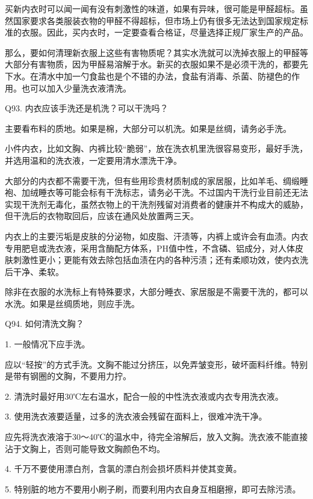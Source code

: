 \documentclass[12pt,UTF8]{ctexbook}
\begin{document}
买新内衣时可以闻一闻有没有刺激性的味道，如果有异味，很可能是甲醛超标。虽然国家要求各类服装衣物的甲醛不得超标，但市场上仍有很多无法达到国家规定标准的衣服。因此，买内衣时，一定要查看合格证，尽量选择正规厂家生产的产品。


那么，要如何清理新衣服上这些有害物质呢？其实水洗就可以洗掉衣服上的甲醛等大部分有害物质，因为甲醛易溶解于水。新买的衣服如果不是必须干洗的，都要先下水。在清水中加一勺食盐也是个不错的办法，食盐有消毒、杀菌、防褪色的作用。也可以加入少量洗衣液清洗。





Q93. 内衣应该手洗还是机洗？可以干洗吗？


主要看布料的质地。如果是棉，大部分可以机洗。如果是丝绸，请务必手洗。

小件内衣，比如文胸、内裤比较“脆弱”，放在洗衣机里洗很容易变形，最好手洗，并选用温和的洗衣液，一定要用清水漂洗干净。

大部分的内衣都不需要干洗，但有些用珍贵材质制成的家居服，比如羊毛、绸缎睡袍、加绒睡衣等可能会标有干洗标志，请务必干洗。不过国内干洗行业目前还无法实现干洗剂无毒化，虽然衣物上的干洗剂残留对消费者的健康并不构成大的威胁，但干洗后的衣物取回后，应该在通风处放置两三天。


内衣上的主要污垢是皮肤的分泌物，如皮脂、汗渍等，内裤上或许会有血渍。内衣专用肥皂或洗衣液，采用含酶配方体系，PH值中性，不含磷、铝成分，对人体皮肤刺激性更小；更能有效去除包括血渍在内的各种污渍；还有柔顺功效，使内衣洗后干净、柔软。


除非在衣服的水洗标上有特殊要求，大部分睡衣、家居服是不需要干洗的，都可以水洗。如果是丝绸质地，则应手洗。





Q94. 如何清洗文胸？


1. 一般情况下应手洗。

应以“轻按”的方式手洗。文胸不能过分挤压，以免弄皱变形，破坏面料纤维。特别是带有钢圈的文胸，不要用力拧。

2. 清洗时最好用30℃左右温水，配合一般的中性洗衣液或内衣专用洗衣液。

3. 使用洗衣液要适量，过多的洗衣液会残留在面料上，很难冲洗干净。

应先将洗衣液溶于30～40℃的温水中，待完全溶解后，放入文胸。洗衣液不能直接沾于文胸上，否则可能导致文胸颜色不均。

4. 千万不要使用漂白剂，含氯的漂白剂会损坏质料并使其变黄。

5. 特别脏的地方不要用小刷子刷，而要利用内衣自身互相磨擦，即可去除污渍。
\end{document}
